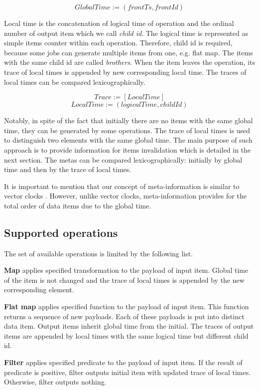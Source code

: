 \[GlobalTime := (frontTs, frontId)\]

Local time is the concatenation of logical time of operation and the ordinal number of output item which we call {\it child id}. The logical time is represented as simple items counter within each operation. Therefore, child id is required, because some jobs can generate multiple items from one, e.g. flat map. The items with the same child id are called {\it brothers}. When the item leaves the operation, its trace of local times is appended by new corresponding local time. The traces of local times can be compared lexicographically.

\[Trace := [LocalTime]\]
\[LocalTime := (logicalTime, childId)\]

Notably, in spite of the fact that initially there are no items with the same global time, they can be generated by some operations. The trace of local times is used to distinguish two elements with the same global time. The main purpose of such approach is to provide information for items invalidation which is detailed in the next section. The metas can be compared lexicographically: initially by global time and then by the trace of local times. 

It is important to mention that our concept of meta-information is similar to vector clocks
\cite{fidge1988timestamps, mattern88virtualtime}
. However, unlike vector clocks, meta-information provides for the total order of data items due to the global time.

\subsection{Supported operations}
The set of available operations is limited by the following list.

{\bf Map} applies specified transformation to the payload of input item. Global time of the item is not changed and the trace of local times is appended by the new corresponding element.

{\bf Flat map} applies specified function to the payload of input item. This function returns a sequence of new payloads. Each of these payloads is put into distinct data item. Output items inherit global time from the initial. The traces of output items are appended by local times with the same logical time but different child id.

{\bf Filter} applies specified predicate to the payload of input item. If the result of predicate is positive, filter outputs initial item with updated trace of local times. Otherwise, filter outputs nothing.

